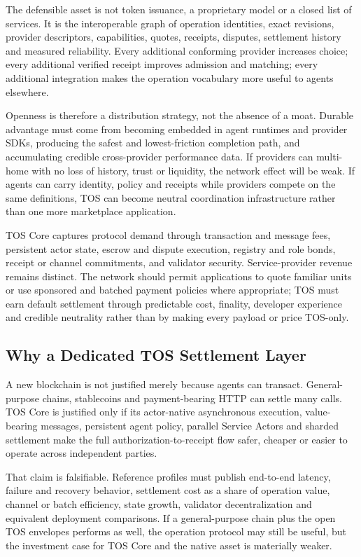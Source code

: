 \documentclass[11pt,oneside]{article}
\begin{document}
The defensible asset is not token issuance, a proprietary model or a closed list of services.
It is the interoperable graph of operation identities, exact revisions, provider descriptors,
capabilities, quotes, receipts, disputes, settlement history and measured reliability. Every
additional conforming provider increases choice; every additional verified receipt improves
admission and matching; every additional integration makes the operation vocabulary more
useful to agents elsewhere.

Openness is therefore a distribution strategy, not the absence of a moat. Durable advantage
must come from becoming embedded in agent runtimes and provider SDKs, producing the safest and
lowest-friction completion path, and accumulating credible cross-provider performance data.
If providers can multi-home with no loss of history, trust or liquidity, the network effect
will be weak. If agents can carry identity, policy and receipts while providers compete on the
same definitions, TOS can become neutral coordination infrastructure rather than one more
marketplace application.

TOS Core captures protocol demand through transaction and message fees, persistent actor
state, escrow and dispute execution, registry and role bonds, receipt or channel commitments,
and validator security. Service-provider revenue remains distinct. The network should permit
applications to quote familiar units or use sponsored and batched payment policies where
appropriate; TOS must earn default settlement through predictable cost, finality, developer
experience and credible neutrality rather than by making every payload or price TOS-only.

\subsection{Why a Dedicated TOS Settlement Layer}

A new blockchain is not justified merely because agents can transact. General-purpose chains,
stablecoins and payment-bearing HTTP can settle many calls. TOS Core is justified only if its
actor-native asynchronous execution, value-bearing messages, persistent agent policy,
parallel Service Actors and sharded settlement make the full authorization-to-receipt flow
safer, cheaper or easier to operate across independent parties.

That claim is falsifiable. Reference profiles must publish end-to-end latency, failure and
recovery behavior, settlement cost as a share of operation value, channel or batch efficiency,
state growth, validator decentralization and equivalent deployment comparisons. If a
general-purpose chain plus the open TOS envelopes performs as well, the operation protocol may
still be useful, but the investment case for TOS Core and the native asset is materially
weaker.
\end{document}
